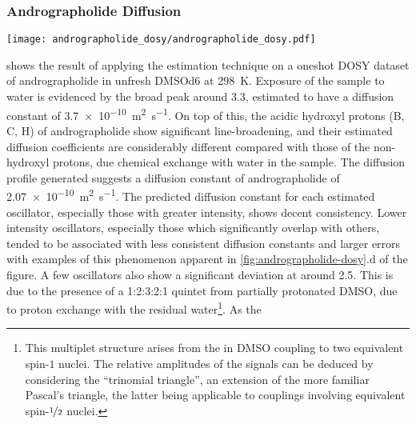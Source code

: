 \subsubsection{Andrographolide Diffusion}
\begin{sidewaysfigure}
    \centering
    \texttt{[image: andrographolide\_dosy/andrographolide\_dosy.pdf]}
    \caption[
        The result of estimating a diffusion dataset of andrographolide.
    ]{
        The result of estimating a diffusion dataset of andrographolide in
        unfresh \acs{DMSOd6}.
        \textbf{a.} \ac{1D} spectrum.
        \textbf{b.} Diffusion profile obtained by projecting the contour plot in
        c onto the $y$-axis.
        \textbf{c.} Contour plot mapping estimated oscillators to diffusion constants, with
        $p_{\text{min}} = \qty{1.5e-10}{\meter\squared\per\second}$,
        $p_{\text{max}} = \qty{4.5e-10}{\meter\squared\per\second}$,
        $c = 2.5$,
        $R=128$.
        \textbf{d.} Magnified view of the \SIrange{2}{1.6}{\partspermillion}
        spectral range, with estimated oscillator peaks plotted.
    }
    \label{fig:andrographolide-dosy}
\end{sidewaysfigure}
 shows the result of applying the
estimation technique on a oneshot \ac{DOSY} dataset of andrographolide in
unfresh \acs{DMSOd6} at \qty{298}{\kelvin}. Exposure of the sample to water is
evidenced by the broad
peak around \qty{3.3}{\partspermillion}, estimated to have a diffusion constant
of \qty{3.7e-10}{\meter\squared\per\second}. On top of this, the acidic
hydroxyl protons (B, C, H) of andrographolide show significant line-broadening,
and their estimated diffusion coefficients are considerably different compared
with those of the non-hydroxyl protons, due chemical exchange with water in the
sample\cite{Chen1998}.
The diffusion profile generated suggests a diffusion constant of andrographolide of
\qty{2.07e-10}{\meter\squared\per\second}. The predicted diffusion constant for
each estimated oscillator, especially those with greater intensity, shows
decent consistency.
Lower intensity oscillators, especially those which
significantly overlap with others, tended to be associated with
less consistent diffusion constants and larger errors with examples of this
phenomenon apparent in \cref{fig:andrographolide-dosy}.d of the figure. A few
oscillators also show a
significant deviation at around \qty{2.5}{\partspermillion}. This is due to the
presence of a 1:2:3:2:1 quintet from partially protonated \acs{DMSO}, due to
proton exchange with the residual water\footnote{
    This multiplet structure arises from the  in \acs{DMSO} coupling to
    two
    equivalent spin-$1$  nuclei. The relative amplitudes of the signals
    can be deduced by considering the ``trinomial triangle'', an extension of
    the more familiar Pascal's triangle, the latter being applicable to
    couplings involving equivalent spin-$\nicefrac{1}{2}$ nuclei.
}. As the

